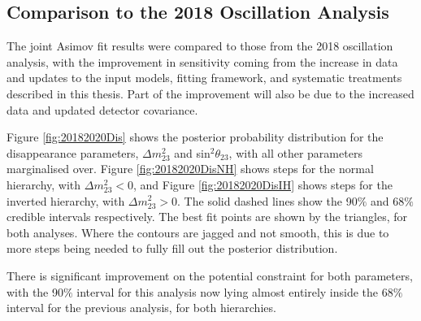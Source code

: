 \subsection{Comparison to the 2018 Oscillation Analysis}\label{sec:joint2018}

The joint Asimov fit results were compared to those from the 2018 oscillation analysis, with the improvement in sensitivity coming from the increase in data and updates to the input models, fitting framework, and systematic treatments described in this thesis. Part of the improvement will also be due to the increased \SK data and updated \SK detector covariance.

Figure \ref{fig:20182020Dis} shows the posterior probability distribution for the disappearance parameters, $\Delta m^{2}_{23}$ and sin$^{2}\theta_{23}$, with all other parameters marginalised over. Figure \ref{fig:20182020DisNH} shows steps for the normal hierarchy, with $\Delta m^{2}_{23}<0$,  and Figure \ref{fig:20182020DisIH} shows steps for the inverted hierarchy, with $\Delta m^{2}_{23}>0$. The solid dashed lines show the 90$\%$ and 68$\%$ credible intervals respectively. The best fit points are shown by the triangles, for both analyses. Where the contours are jagged and not smooth, this is due to more steps being needed to fully fill out the posterior distribution.

There is significant improvement on the potential constraint for both parameters, with the 90$\%$ interval for this analysis now lying almost entirely inside the 68$\%$ interval for the previous analysis, for both hierarchies.


